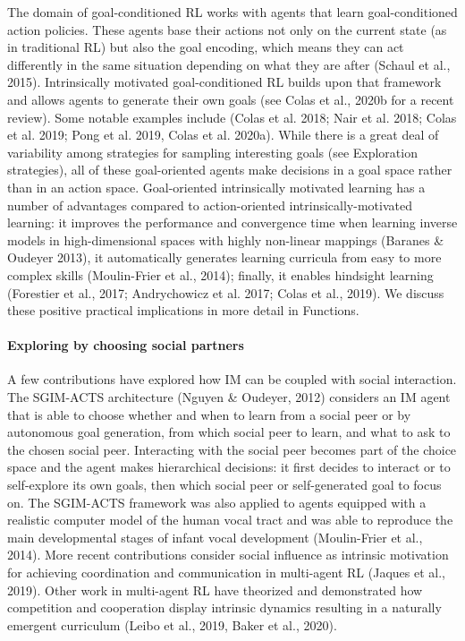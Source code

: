 The domain of goal-conditioned \ac{RL} works with agents that learn goal-conditioned action policies. These agents base their actions not only on the current state (as in traditional \ac{RL}) but also the goal encoding, which means they can act differently in the same situation depending on what they are after (Schaul et al., 2015). Intrinsically motivated goal-conditioned \ac{RL} builds upon that framework and allows agents to generate their own goals (see Colas et al., 2020b for a recent review). Some notable examples include (Colas et al. 2018; Nair et al. 2018; Colas et al. 2019; Pong et al. 2019, Colas et al. 2020a). While there is a great deal of variability among strategies for sampling interesting goals (see Exploration strategies), all of these goal-oriented agents make decisions in a goal space rather than in an action space. Goal-oriented intrinsically motivated learning has a number of advantages compared to action-oriented intrinsically-motivated learning: it improves the performance and convergence time when learning inverse models in high-dimensional spaces with highly non-linear mappings (Baranes \& Oudeyer 2013), it automatically generates learning curricula from easy to more complex skills (Moulin-Frier et al., 2014); finally, it enables hindsight learning (Forestier et al., 2017; Andrychowicz et al. 2017; Colas et al., 2019). We discuss these positive practical implications in more detail in Functions.

\paragraph{Exploring by choosing social partners}
A few contributions have explored how IM can be coupled with social interaction. The SGIM-ACTS architecture (Nguyen \& Oudeyer, 2012) considers an IM agent that is able to choose whether and when to learn from a social peer or by autonomous goal generation, from which social peer to learn, and what to ask to the chosen social peer. Interacting with the social peer becomes part of the choice space and the agent makes hierarchical decisions: it first decides to interact or to self-explore its own goals, then which social peer or self-generated goal to focus on. The SGIM-ACTS framework was also applied to agents equipped with a realistic computer model of the human vocal tract and was able to reproduce the main developmental stages of infant vocal development (Moulin-Frier et al., 2014). More recent contributions consider social influence as intrinsic motivation for achieving coordination and communication in multi-agent \ac{RL} (Jaques et al., 2019). Other work in multi-agent \ac{RL} have theorized and demonstrated how competition and cooperation display intrinsic dynamics resulting in a naturally emergent curriculum (Leibo et al., 2019, Baker et al., 2020).

